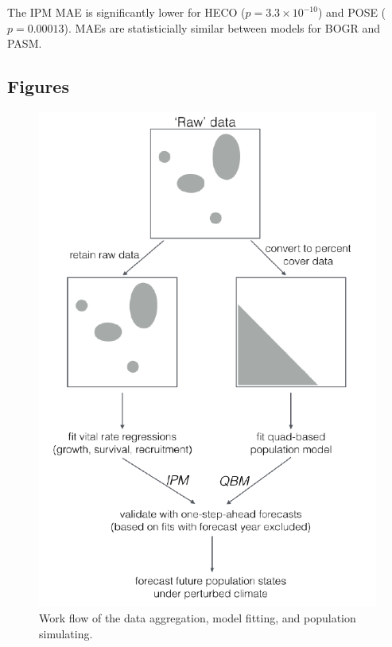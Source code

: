 \documentclass[12pt,]{article}
\begin{document}
The IPM MAE is significantly lower for HECO
(\(p = 3.3 \times 10^{-10}\)) and POSE (\(p = 0.00013\)). MAEs are
statisticially similar between models for BOGR and PASM.

\pagebreak{}

\pagebreak{}

\subsection{Figures}\label{figures}

\begin{figure}[htbp]
\centering
\includegraphics{components/figure/manuscript-figure_1.pdf}
\caption{Work flow of the data aggregation, model fitting, and
population simulating.}
\end{figure}
\end{document}
